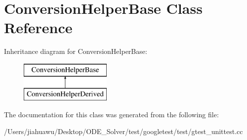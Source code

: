 \hypertarget{class_conversion_helper_base}{}\section{Conversion\+Helper\+Base Class Reference}
\label{class_conversion_helper_base}
Inheritance diagram for Conversion\+Helper\+Base\+:\begin{figure}[H]
\begin{center}
\leavevmode
\includegraphics[height=2.000000cm]{class_conversion_helper_base}
\end{center}
\end{figure}


The documentation for this class was generated from the following file\+:\begin{DoxyCompactItemize}
\item 
/\+Users/jiahuawu/\+Desktop/\+O\+D\+E\+\_\+\+Solver/test/googletest/test/gtest\+\_\+unittest.\+cc\end{DoxyCompactItemize}
